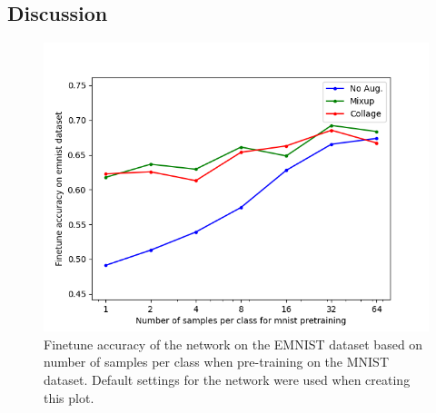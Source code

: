 \documentclass[english,11pt,a4paper,titlepage]{report}
\begin{document}
	\newpage
	
	\subsection*{Discussion}
	\begin{figure}[h]
		\centering
		\includegraphics[width=0.7\linewidth]{semisupervised_deep_learning/Figure_1}
		\caption{Finetune accuracy of the network on the EMNIST dataset based on number of samples per class when pre-training on the MNIST dataset. Default settings for the network were used when creating this plot.}
		\label{fig:figure1}
	\end{figure}
	
\end{document}
